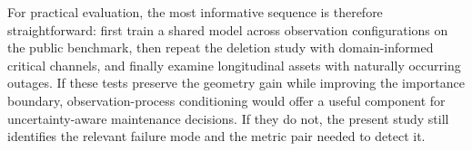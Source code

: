 For practical evaluation, the most informative sequence is therefore straightforward: first train a shared model across observation configurations on the public benchmark, then repeat the deletion study with domain-informed critical channels, and finally examine longitudinal assets with naturally occurring outages. If these tests preserve the geometry gain while improving the importance boundary, observation-process conditioning would offer a useful component for uncertainty-aware maintenance decisions. If they do not, the present study still identifies the relevant failure mode and the metric pair needed to detect it.
